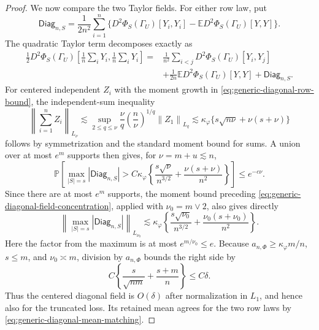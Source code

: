 \documentclass[a4paper,11pt,english]{article}
\newcommand{\E}{\mathbb E}
\newcommand{\Prob}{\mathbb P}
\newcommand{\norm}[1]{\left\lVert #1\right\rVert}
\begin{document}
\begin{proof}
We now compare the two Taylor fields.  For either row law, put
\[
        \mathsf{Diag}_{n,S}
        =\frac1{2n^2}\sum_{i=1}^n
        \{D^2\Phi_S(\Gamma_U)[Y_i,Y_i]
        -\E D^2\Phi_S(\Gamma_U)[Y,Y]\}.
\]
The quadratic Taylor term decomposes exactly as
\begin{equation}\label{eq:generic-taylor-diagonal-split}
\begin{split}
 \frac12D^2\Phi_S(\Gamma_U)\left[\frac1n\sum_iY_i,
                         \frac1n\sum_iY_i\right]
 ={}&\frac1{n^2}\sum_{i<j}D^2\Phi_S(\Gamma_U)[Y_i,Y_j]\\
 &+\frac1{2n}\E D^2\Phi_S(\Gamma_U)[Y,Y]+\mathsf{Diag}_{n,S}.
\end{split}
\end{equation}
For centered independent $Z_i$ with the moment growth in
\eqref{eq:generic-diagonal-row-bound}, the independent-sum inequality
\[
 \norm{\textstyle\sum_{i=1}^n Z_i}_{L_\nu}
 \lesssim
 \sup_{2\le q\le\nu}
 \frac\nu q\left(\frac n\nu\right)^{1/q}\norm{Z_1}_{L_q}
 \lesssim \kappa_\varphi
 \{s\sqrt{n\nu}+\nu(s+\nu)\}
\]
follows by symmetrization and the standard moment bound for sums.  A
union over at most $e^m$ supports then gives, for $\nu=m+u\lesssim n$,
\begin{equation}\label{eq:generic-diagonal-field-concentration}
 \Prob\left[
 \max_{|S|=s}|\mathsf{Diag}_{n,S}|
 >C\kappa_\varphi
 \left\{\frac{s\sqrt\nu}{n^{3/2}}
 +\frac{\nu(s+\nu)}{n^2}\right\}
 \right]\le e^{-c\nu}.
\end{equation}
Since there are at most $e^m$ supports, the moment bound preceding
\eqref{eq:generic-diagonal-field-concentration}, applied with
$\nu_0=m\vee2$, also gives directly
\[
 \left\|\max_{|S|=s}|\mathsf{Diag}_{n,S}|\right\|_{L_{\nu_0}}
 \lesssim \kappa_\varphi
 \left\{\frac{s\sqrt{\nu_0}}{n^{3/2}}
 +\frac{\nu_0(s+\nu_0)}{n^2}\right\}.
\]
Here the factor from the maximum is at most
$e^{m/\nu_0}\le e$.  Because
$a_{n,\Phi}\ge\kappa_\varphi m/n$, $s\le m$, and
$\nu_0\asymp m$, division by $a_{n,\Phi}$ bounds the right side by
\[
 C\left\{\frac{s}{\sqrt{nm}}+\frac{s+m}{n}\right\}
 \le C\delta.
\]
Thus the centered diagonal field is $O(\delta)$ after normalization in
$L_1$, and hence also for the truncated loss.  Its retained mean agrees
for the two row laws by \eqref{eq:generic-diagonal-mean-matching}.


\end{proof}
\end{document}
